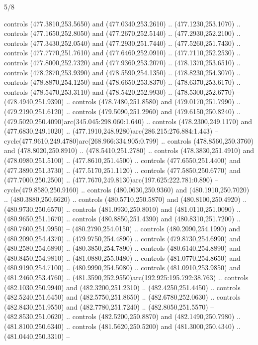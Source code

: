 \begin{flagdescription}{5/8}
\begin{scope}[xshift=0.5\flaglength,yshift=0.5\flagwidth,scale=\flagwidth/475.63]
\begin{scope}[y=0.8pt, x=0.8pt, yscale=-1, xscale=1,shift={(-450,-300)}]
\begin{scope}[cm={{1.0,0.0,0.0,1.0,(-0.0002,0.12556)}},cm={{1.0,0.0,0.0,1.0,(0.00179,0.0)}}]
\begin{scope}[cm={{1.00926,0.0,0.0,1.00926,(-3.1541,-2.47648)}}]
  controls (477.3810,253.5650) and (477.0340,253.2610) .. (477.1230,253.1070) ..
  controls (477.1650,252.8050) and (477.2670,252.5140) .. (477.2930,252.2100) ..
  controls (477.3430,252.0540) and (477.2930,251.7440) .. (477.5260,251.7430) ..
  controls (477.7770,251.7610) and (477.6460,252.0910) .. (477.7110,252.2530) ..
  controls (477.8000,252.7320) and (477.9360,253.2070) .. (478.1370,253.6510) ..
  controls (478.2870,253.9390) and (478.5590,254.1350) .. (478.8230,254.3070) ..
  controls (478.8870,254.1250) and (478.6650,253.8370) .. (478.6370,253.6170) ..
  controls (478.5470,253.3110) and (478.5420,252.9930) .. (478.5300,252.6770) --
  (478.4940,251.9390) .. controls (478.7480,251.8580) and (479.0170,251.7990) ..
  (479.2190,251.6120) .. controls (479.5090,251.2960) and (479.6150,250.8240) ..
  (479.5020,250.4090)arc(345.045:298.060:1.640) .. controls (478.2300,249.1170)
  and (477.6830,249.1020) .. (477.1910,248.9280)arc(286.215:276.884:1.443) --
  cycle(477.9610,249.4780)arc(268.966:334.905:0.799) .. controls
  (478.8560,250.3760) and (478.8020,250.8910) .. (478.5410,251.2780) .. controls
  (478.3830,251.4910) and (478.0980,251.5100) .. (477.8610,251.4500) .. controls
  (477.6550,251.4400) and (477.3890,251.3730) .. (477.5170,251.1120) .. controls
  (477.5850,250.6770) and (477.7000,250.2500) ..
  (477.7670,249.8130)arc(197.625:222.781:0.890) -- cycle(479.8580,250.9160) ..
  controls (480.0630,250.9360) and (480.1910,250.7020) .. (480.3880,250.6620) ..
  controls (480.5710,250.5870) and (480.8100,250.4920) .. (480.9730,250.6570) ..
  controls (481.0930,250.8010) and (481.0110,251.0090) .. (480.9650,251.1670) ..
  controls (480.8850,251.4390) and (480.8310,251.7200) .. (480.7600,251.9950) --
  (480.2790,254.0150) .. controls (480.2090,254.1990) and (480.2090,254.4370) ..
  (479.9750,254.4890) .. controls (479.8730,254.6990) and (480.2580,254.6890) ..
  (480.3850,254.7890) .. controls (480.6140,254.8890) and (480.8450,254.9810) ..
  (481.0880,255.0480) .. controls (481.0770,254.8650) and (480.9190,254.7100) ..
  (480.9990,254.5080) .. controls (481.0910,253.9850) and (481.2460,253.4760) ..
  (481.3590,252.9550)arc(192.925:195.792:38.763) .. controls (482.1030,250.9940)
  and (482.3200,251.2310) .. (482.4250,251.4450) .. controls (482.5240,251.6450)
  and (482.5750,251.8650) .. (482.6780,252.0630) .. controls (482.8430,251.9550)
  and (482.7780,251.7240) .. (482.8050,251.5570) -- (482.8530,251.0620) ..
  controls (482.5200,250.8870) and (482.1490,250.7980) .. (481.8100,250.6340) ..
  controls (481.5620,250.5200) and (481.3000,250.4340) .. (481.0440,250.3310) --

\end{scope}
\end{scope}
\end{scope}
\end{scope}
\end{flagdescription}
